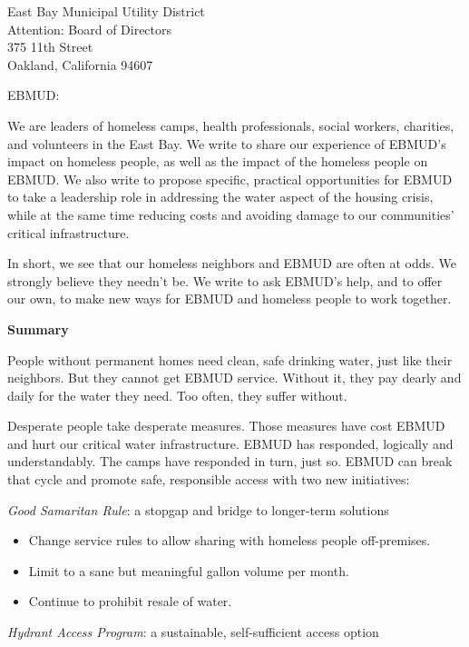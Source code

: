 \documentclass[letterpaper]{letter}
\date{November 27, 2020}
\begin{document}
  \begin{letter}{%
    East Bay Municipal Utility District\\
    Attention: Board of Directors\\
    375 11th Street\\
    Oakland, California 94607}

    \opening{EBMUD:}

    We are leaders of homeless camps, health professionals, social workers, charities, and volunteers in the East Bay. We write to share our experience of EBMUD’s impact on homeless people, as well as the impact of the homeless people on EBMUD. We also write to propose specific, practical opportunities for EBMUD to take a leadership role in addressing the water aspect of the housing crisis, while at the same time reducing costs and avoiding damage to our communities’ critical infrastructure.

    In short, we see that our homeless neighbors and EBMUD are often at odds. We strongly believe they needn’t be. We write to ask EBMUD’s help, and to offer our own, to make new ways for EBMUD and homeless people to work together.

    \begin{samepage}
    \textbf{Summary}

    People without permanent homes need clean, safe drinking water, just like their neighbors. But they cannot get EBMUD service. Without it, they pay dearly and daily for the water they need. Too often, they suffer without.

    Desperate people take desperate measures. Those measures have cost EBMUD and hurt our critical water infrastructure. EBMUD has responded, logically and understandably. The camps have responded in turn, just so. EBMUD can break that cycle and promote safe, responsible access with two new initiatives:

    \emph{Good Samaritan Rule}: a stopgap and bridge to longer-term solutions

    \begin{itemize}
      \item Change service rules to allow sharing with homeless people off-premises.
      \item Limit to a sane but meaningful gallon volume per month.
      \item Continue to prohibit resale of water.
    \end{itemize}

    \emph{Hydrant Access Program}: a sustainable, self-sufficient access option


\end{samepage}
\end{letter}
\end{document}
